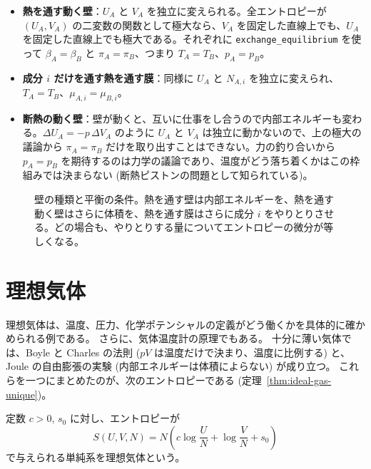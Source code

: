 \begin{itemize}
  \item \textbf{熱を通す動く壁}：$U_A$ と $V_A$ を独立に変えられる。全エントロピーが $(U_A, V_A)$ の二変数の関数として極大なら、$V_A$ を固定した直線上でも、$U_A$ を固定した直線上でも極大である。それぞれに \texttt{exchange\_equilibrium} を使って $\beta_A = \beta_B$ と $\pi_A = \pi_B$、つまり $T_A = T_B$、$p_A = p_B$。
  \item \textbf{成分 $i$ だけを通す熱を通す膜}：同様に $U_A$ と $N_{A,i}$ を独立に変えられ、$T_A = T_B$、$\mu_{A,i} = \mu_{B,i}$。
  \item \textbf{断熱の動く壁}：壁が動くと、互いに仕事をし合うので内部エネルギーも変わる。$\Delta U_A = -p\, \Delta V_A$ のように $U_A$ と $V_A$ は独立に動かないので、上の極大の議論から $\pi_A = \pi_B$ だけを取り出すことはできない。力の釣り合いから $p_A = p_B$ を期待するのは力学の議論であり、温度がどう落ち着くかはこの枠組みでは決まらない (断熱ピストンの問題として知られている)。
\end{itemize}

\begin{figure}[htbp]
  \centering
  \caption{壁の種類と平衡の条件。熱を通す壁は内部エネルギーを、熱を通す動く壁はさらに体積を、熱を通す膜はさらに成分 $i$ をやりとりさせる。どの場合も、やりとりする量についてエントロピーの微分が等しくなる。}
  \label{fig:walls}
\end{figure}

\section{理想気体}
\label{sec:ideal-gas}

理想気体は、温度、圧力、化学ポテンシャルの定義がどう働くかを具体的に確かめられる例である。
さらに、気体温度計の原理でもある。
十分に薄い気体では、Boyle と Charles の法則 ($pV$ は温度だけで決まり、温度に比例する) と、Joule の自由膨張の実験 (内部エネルギーは体積によらない) が成り立つ。
これらを一つにまとめたのが、次のエントロピーである (定理~\ref{thm:ideal-gas-unique})。

\begin{definition}[理想気体]
  \label{def:ideal-gas}
  \leanok
  定数 $c > 0$, $s_0$ に対し、エントロピーが
  \[ S(U, V, N) = N \left( c \log \frac{U}{N} + \log \frac{V}{N} + s_0 \right) \]
  で与えられる単純系を理想気体という。
\end{definition}

